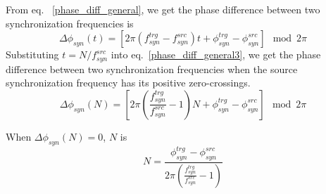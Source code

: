 From eq. ~\ref{phase_diff_general}, we get the phase difference between two synchronization frequencies is 
\begin{equation}
	\Delta \phi_\mathit{syn}(t)=[2\pi(f_{\mathit{syn}}^\mathit{trg}-f_{\mathit{syn}}^\mathit{src})t+\phi_\mathit{syn}^\mathit{trg}-\phi^\mathit{src}_\mathit{syn}] \mod 2\pi \label{phase_diff_general3}
\end{equation}
Substituting $t=N/f_{\mathit{syn}}^{src}$ into eq.~\ref{phase_diff_general3}, we get the phase difference between two synchronization frequencies when the source synchronization frequency has its positive zero-crossings.
\begin{equation}
	\Delta \phi_\mathit{syn}(N)=[2\pi(\frac{f_\mathit{syn}^\mathit{trg}}{f_\mathit{syn}^\mathit{src}}-1)N+\phi_\mathit{syn}^\mathit{trg}-\phi^\mathit{src}_\mathit{syn}] \mod 2\pi
\end{equation}

When $\Delta \phi_\mathit{syn}(N)=0$, $N$ is 
\begin{equation}
	N=\frac{\phi_\mathit{syn}^\mathit{trg}-\phi^\mathit{src}_\mathit{syn}}{2\pi(\frac{f_\mathit{syn}^\mathit{trg}}{f_\mathit{syn}^\mathit{src}}-1)} 
\end{equation}

